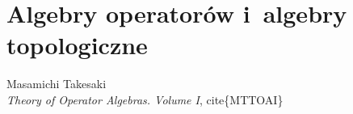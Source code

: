 \documentclass[a4paper,11pt]{article}
\begin{document}
\VerSpaceSix


\noindent























\section{Algebry operatorów i~algebry topologiczne}













\newpage

{ %
  Masamichi Takesaki \\
  \textit{Theory of Operator Algebras. Volume I}, cite\{MTTOAI\}}
\end{document}
